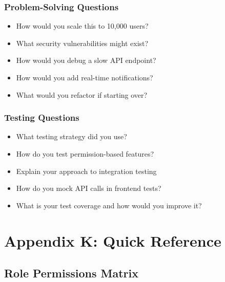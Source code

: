 \documentclass[11pt,a4paper]{article}
\begin{document}
\subsubsection{Problem-Solving Questions}
\begin{itemize}[leftmargin=*]
    \item How would you scale this to 10,000 users?
    \item What security vulnerabilities might exist?
    \item How would you debug a slow API endpoint?
    \item How would you add real-time notifications?
    \item What would you refactor if starting over?
\end{itemize}

\subsubsection{Testing Questions}
\begin{itemize}[leftmargin=*]
    \item What testing strategy did you use?
    \item How do you test permission-based features?
    \item Explain your approach to integration testing
    \item How do you mock API calls in frontend tests?
    \item What is your test coverage and how would you improve it?
\end{itemize}

\section{Appendix K: Quick Reference}

\subsection{Role Permissions Matrix}
\end{document}
